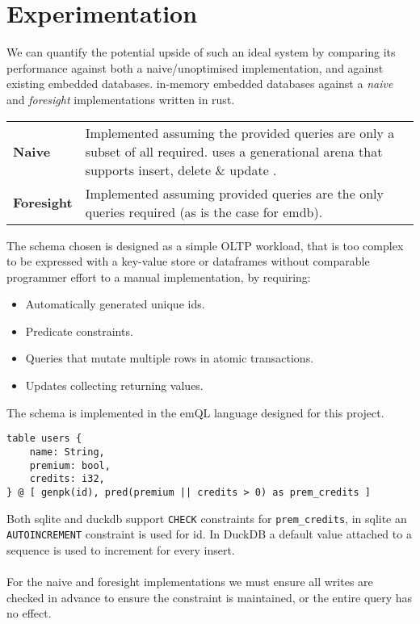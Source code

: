 \section{Experimentation}
We can quantify the potential upside of such an ideal system by comparing its performance against both a naive/unoptimised implementation, and against existing embedded databases.
in-memory embedded databases against a \textit{naive} and \textit{foresight} implementations written in rust.
\begin{center}
    \begin{tabular}{l p{}}
        \textbf{Naive}     & Implemented assuming the provided queries are only a subset of all required. uses a generational arena\cite{TypedGenerationalArenaRepo} that supports insert, delete \& update . \\
        \textbf{Foresight} & Implemented assuming provided queries are the only queries required (as is the case for emdb).                                                                                   \\
    \end{tabular}
\end{center}
\noindent
The schema chosen is designed as a simple OLTP workload, that is too complex to be expressed with a key-value store or dataframes without comparable programmer effort to a manual implementation, by requiring:
\begin{itemize}
    \setlength\itemsep{0em}
    \item Automatically generated unique ids.
    \item Predicate constraints.
    \item Queries that mutate multiple rows in atomic transactions.
    \item Updates collecting returning values.
\end{itemize}
The schema is implemented in the emQL language designed for this project.
\begin{verbatim}
table users {
    name: String,
    premium: bool,
    credits: i32,
} @ [ genpk(id), pred(premium || credits > 0) as prem_credits ]
\end{verbatim}
Both sqlite and duckdb support \texttt{CHECK} constraints for \texttt{prem_credits},
in sqlite an \texttt{AUTOINCREMENT} constraint is used for id. In DuckDB a default value
attached to a sequence is used to increment for every insert.
\\
\\ For the naive and foresight implementations we must ensure all writes are checked in advance to ensure the constraint is maintained, or the entire query has no effect.
